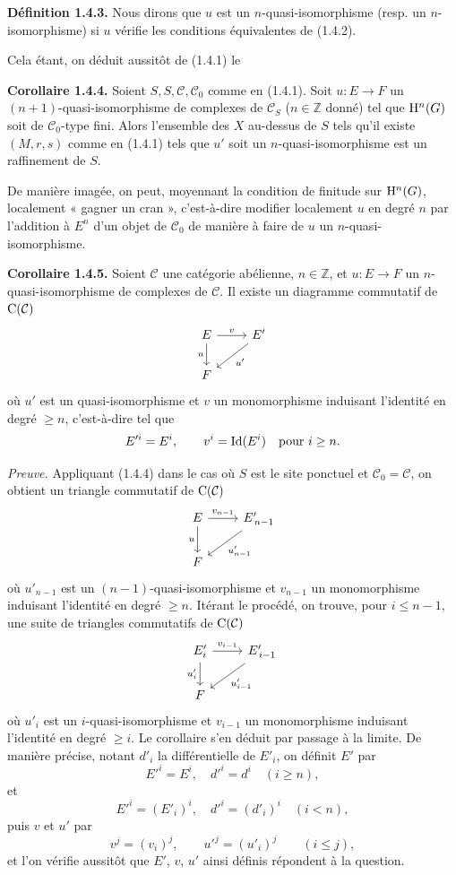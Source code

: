 \documentclass[11pt]{article}
\begin{document}
\textbf{Définition 1.4.3.} Nous dirons que \(u\) est un \(n\)-quasi-isomorphisme (resp. un \(n\)-isomorphisme) si \(u\) vérifie les conditions équivalentes de (1.4.2).

Cela étant, on déduit aussitôt de (1.4.1) le

\textbf{Corollaire 1.4.4.} Soient \(S,S,\mathcal C,\mathcal C_0\) comme en (1.4.1). Soit \(u:E\to F\) un \((n+1)\)-quasi-isomorphisme de complexes de \(\mathcal C_S\) (\(n\in\mathbb Z\) donné) tel que \(\mathrm H^n(G)\) soit de \(\mathcal C_0\)-type fini. Alors l'ensemble des \(X\) au-dessus de \(S\) tels qu'il existe \((M,r,s)\) comme en (1.4.1) tels que \(u'\) soit un \(n\)-quasi-isomorphisme est un raffinement de \(S\).

De manière imagée, on peut, moyennant la condition de finitude sur \(\mathrm H^n(G)\), localement « gagner un cran », c'est-à-dire modifier localement \(u\) en degré \(n\) par l'addition à \(E^n\) d'un objet de \(\mathcal C_0\) de manière à faire de \(u\) un \(n\)-quasi-isomorphisme.

\textbf{Corollaire 1.4.5.} Soient \(\mathcal C\) une catégorie abélienne, \(n\in\mathbb Z\), et \(u:E\to F\) un \(n\)-quasi-isomorphisme de complexes de \(\mathcal C\). Il existe un diagramme commutatif de \(\mathrm C(\mathcal C)\)
\[
\begin{tikzcd}
E \arrow[r,"v"] \arrow[d,"u"'] & E' \arrow[dl,"u'"]\\
F &
\end{tikzcd}
\]
où \(u'\) est un quasi-isomorphisme et \(v\) un monomorphisme induisant l'identité en degré \(\geq n\), c'est-à-dire tel que
\[
  E'^i=E^i,\qquad v^i=\operatorname{Id}(E^i)\quad\text{pour }i\geq n.
\]

\emph{Preuve.} Appliquant (1.4.4) dans le cas où \(S\) est le site ponctuel et \(\mathcal C_0=\mathcal C\), on obtient un triangle commutatif de \(\mathrm C(\mathcal C)\)
\[
\begin{tikzcd}
E \arrow[r,"v_{n-1}"] \arrow[d,"u"'] & E'_{\,n-1} \arrow[dl,"u'_{n-1}"]\\
F &
\end{tikzcd}
\]
où \(u'_{n-1}\) est un \((n-1)\)-quasi-isomorphisme et \(v_{n-1}\) un monomorphisme induisant l'identité en degré \(\geq n\). Itérant le procédé, on trouve, pour \(i\leq n-1\), une suite de triangles commutatifs de \(\mathrm C(\mathcal C)\)
\[
\begin{tikzcd}
E'_i \arrow[r,"v_{i-1}"] \arrow[d,"u'_i"'] & E'_{\,i-1} \arrow[dl,"u'_{i-1}"]\\
F &
\end{tikzcd}
\]
où \(u'_i\) est un \(i\)-quasi-isomorphisme et \(v_{i-1}\) un monomorphisme induisant l'identité en degré \(\geq i\). Le corollaire s'en déduit par passage à la limite. De manière précise, notant \(d'_i\) la différentielle de \(E'_i\), on définit \(E'\) par
\[
  E'^i=E^i,\quad d'^i=d^i\quad (i\geq n),
\]
et
\[
  E'^i=(E'_i)^i,\quad d'^i=(d'_i)^i\quad (i<n),
\]
puis \(v\) et \(u'\) par
\[
  v^j=(v_i)^j,\qquad u'^j=(u'_i)^j\qquad (i\leq j),
\]
et l'on vérifie aussitôt que \(E'\), \(v\), \(u'\) ainsi définis répondent à la question.
\end{document}
